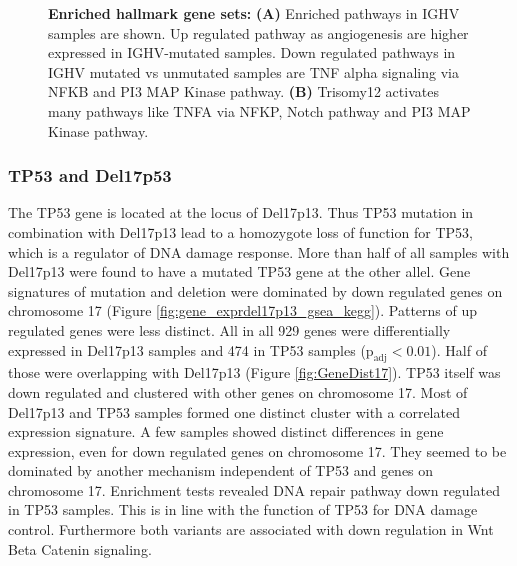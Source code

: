 \begin{figure}
\begin{subfigure}[t]{0.48\columnwidth}
		\subcaption*{}
		\label{fig:gsea_trisomy12}
	\end{subfigure}
	\caption{\textbf{Enriched hallmark gene sets:} \textbf{(A)} Enriched pathways in IGHV samples are shown. Up regulated pathway as angiogenesis are higher expressed in IGHV-mutated samples. Down regulated pathways in IGHV mutated vs unmutated samples are TNF alpha signaling via NFKB and PI3 MAP Kinase pathway. \textbf{(B)} Trisomy12 activates many pathways like TNFA via NFKP, Notch pathway and PI3 MAP Kinase pathway.}
	\label{fig:EnrichmentTri12IGHV}
\end{figure}

\FloatBarrier


\subsubsection{TP53 and Del17p53}
The TP53 gene is located at the locus of Del17p13. Thus TP53 mutation in combination with Del17p13 lead to a homozygote loss of function for TP53, which is a regulator of DNA damage response. More than half of all samples with Del17p13 were found to have a mutated TP53 gene at the other allel. Gene signatures of mutation and deletion were dominated by down regulated genes on chromosome 17 (Figure \ref{fig:gene_exprdel17p13_gsea_kegg}). Patterns of up regulated genes were less distinct. All in all 929 genes were differentially expressed in Del17p13 samples and 474 in TP53 samples ($\text{p}_\text{adj} < 0.01$). Half of those were overlapping with Del17p13 (Figure \ref{fig:GeneDist17}). TP53 itself was down regulated and clustered with other genes on chromosome 17. Most of Del17p13 and TP53 samples formed one distinct cluster with a correlated expression signature. A few samples showed distinct differences in gene expression, even for down regulated genes on chromosome 17. They seemed to be dominated by another mechanism independent of TP53 and genes on chromosome 17. Enrichment tests revealed DNA repair pathway down regulated in TP53 samples. This is in line with the function of TP53 for DNA damage control. Furthermore both variants are associated with down regulation in Wnt Beta Catenin signaling.   

\FloatBarrier

